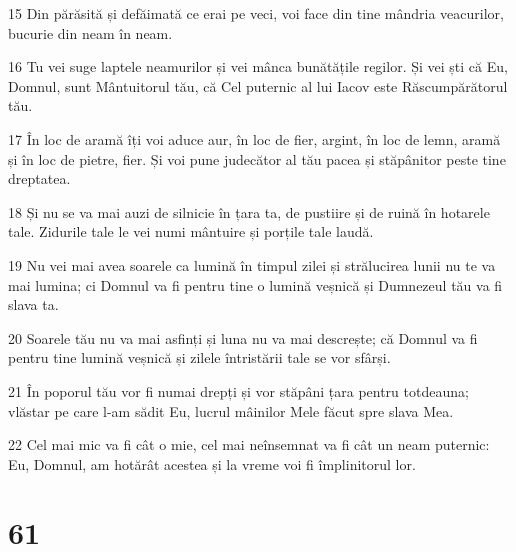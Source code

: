 \par 15 Din părăsită și defăimată ce erai pe veci, voi face din tine mândria veacurilor, bucurie din neam în neam.
\par 16 Tu vei suge laptele neamurilor și vei mânca bunătățile regilor. Și vei ști că Eu, Domnul, sunt Mântuitorul tău, că Cel puternic al lui Iacov este Răscumpărătorul tău.
\par 17 În loc de aramă îți voi aduce aur, în loc de fier, argint, în loc de lemn, aramă și în loc de pietre, fier. Și voi pune judecător al tău pacea și stăpânitor peste tine dreptatea.
\par 18 Și nu se va mai auzi de silnicie în țara ta, de pustiire și de ruină în hotarele tale. Zidurile tale le vei numi mântuire și porțile tale laudă.
\par 19 Nu vei mai avea soarele ca lumină în timpul zilei și strălucirea lunii nu te va mai lumina; ci Domnul va fi pentru tine o lumină veșnică și Dumnezeul tău va fi slava ta.
\par 20 Soarele tău nu va mai asfinți și luna nu va mai descrește; că Domnul va fi pentru tine lumină veșnică și zilele întristării tale se vor sfârși.
\par 21 În poporul tău vor fi numai drepți și vor stăpâni țara pentru totdeauna; vlăstar pe care l-am sădit Eu, lucrul mâinilor Mele făcut spre slava Mea.
\par 22 Cel mai mic va fi cât o mie, cel mai neînsemnat va fi cât un neam puternic: Eu, Domnul, am hotărât acestea și la vreme voi fi împlinitorul lor.

\chapter{61}

